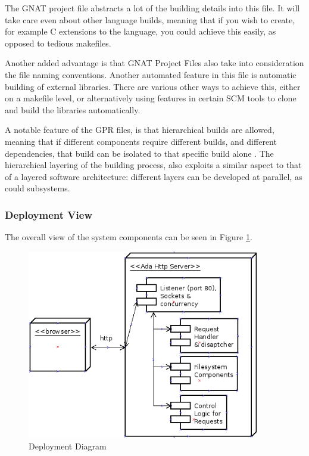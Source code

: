 The GNAT project file abstracts a lot of the building details into this file. It will take care even about other language builds, meaning that if you wish to create, for example C extensions to the language, you could achieve this easily, as opposed to tedious makefiles. 

Another added advantage is that GNAT Project Files also take into consideration the file naming conventions. Another automated feature in this file is automatic building of external libraries. There are various other ways to achieve this, either on a makefile level, or alternatively using features in certain SCM tools to clone and build the libraries automatically. 

A notable feature of the GPR files, is that hierarchical builds are allowed, meaning that if different components require different builds, and different dependencies, that build can be isolated to that specific build alone \cite{GNATintro}. The hierarchical layering of the building process, also exploits a similar aspect to that of a layered software architecture: different layers can be developed at parallel, as could subsystems. 

\subsubsection{Deployment View}
The overall view of the system components can be seen in Figure \ref{fig:deployment}. 

\begin{figure}[hb]
\centering
\includegraphics[width=4in]{gfx/deployment.png}
\caption{Deployment Diagram}
\label{fig:deployment}
\end{figure}
